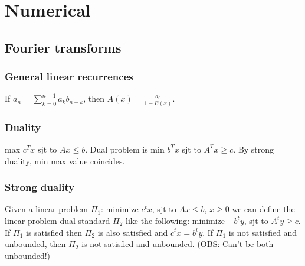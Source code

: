 \chapter{Numerical}
\section{Fourier transforms}

\subsection{General linear recurrences}
  If $a_n = \sum_{k=0}^{n-1} a_k b_{n-k}$, then 
  $A(x) = \frac{a_0}{1-B(x)}$.

\iffalse
\subsection{Fast subset convolution}
  Given array $a_i$ of size $2^k$ calculate $b_i = \sum_{j \BitAnd i = i} a_j$.
\fi

\subsection{Duality}
  max $c^Tx$ sjt to $Ax \leq b$. Dual problem is min $b^Tx$ sjt to $A^Tx \geq c$. By strong duality, min max value coincides.\\

  \subsection{Strong duality}
  Given a linear problem $\Pi_{1}$: minimize $c^t x$, sjt to $Ax \leq b$, $x \geq 0$ we can define the linear problem dual standard $\Pi_{2}$ like the following: minimize $-b^t y$, sjt to $A^t y \geq c$. If $\Pi_{1}$ is satisfied then $\Pi_{2}$ is also satisfied and $c^t x = b^t y$. If $\Pi_{1}$ is not satisfied and unbounded, then $\Pi_{2}$ is not satisfied and unbounded. (OBS: Can't be both unbounded!)

